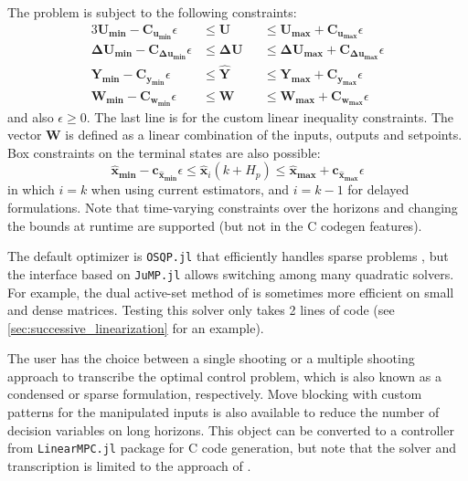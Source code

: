 The problem is subject to the following constraints:
\begin{alignat}{3}
    \mathbf{U_{min}  - C_{u_{min}}}  \epsilon 
         &\le \mathbf{U}  
        &&\le \mathbf{U_{max}  + C_{u_{max}}}  \epsilon \label{eq:u_constraints} \\
    \mathbf{ΔU_{min} - C_{Δu_{min}}} \epsilon 
         &\le \mathbf{ΔU} 
        &&\le \mathbf{ΔU_{max} + C_{Δu_{max}}} \epsilon \\
    \mathbf{Y_{min}  - C_{y_{min}}}  \epsilon 
         &\le \mathbf{\hat{Y}} 
        &&\le \mathbf{Y_{max}  + C_{y_{max}}}  \epsilon \\
    \mathbf{W_{min}  - C_{w_{min}}}  \epsilon 
         &\le \mathbf{W} 
        &&\le \mathbf{W_{max}  + C_{w_{max}}}  \epsilon \label{eq:w_constraints}
\end{alignat}
and also $\epsilon \ge 0$. The last line is for the custom linear inequality constraints. The vector $\mathbf{W}$ is defined as a linear combination of the inputs, outputs and setpoints. Box constraints on the terminal states are also possible: 
\begin{equation}
\mathbf{\hat{x}_{min}} - \mathbf{c_{\hat{x}_{min}}}\epsilon \le \mathbf{\hat{x}}_{i}(k+H_p) \le \mathbf{\hat{x}_{max}} + \mathbf{c_{\hat{x}_{max}}}\epsilon
\end{equation}
in which $i=k$ when using current estimators, and $i=k-1$ for delayed formulations. Note that time-varying constraints over the horizons and changing the bounds at runtime are supported (but not in the C codegen features).

The default optimizer is \texttt{OSQP.jl} that efficiently handles sparse problems \citep{osqp}, but the interface based on \texttt{JuMP.jl} allows switching among many quadratic solvers. For example, the dual active-set method of \citet{daqp} is sometimes more efficient on small and dense matrices. Testing this solver only takes 2 lines of code (see \cref{sec:successive_linearization} for an example). 

The user has the choice between a single shooting or a multiple shooting approach to transcribe the optimal control problem, which is also known as a condensed or sparse formulation, respectively. Move blocking with custom patterns for the manipulated inputs is also available to reduce the number of decision variables on long horizons. This object can be converted to a controller from \texttt{LinearMPC.jl} package for C code generation, but note that the solver and transcription is limited to the approach of \citet{daqp}.

